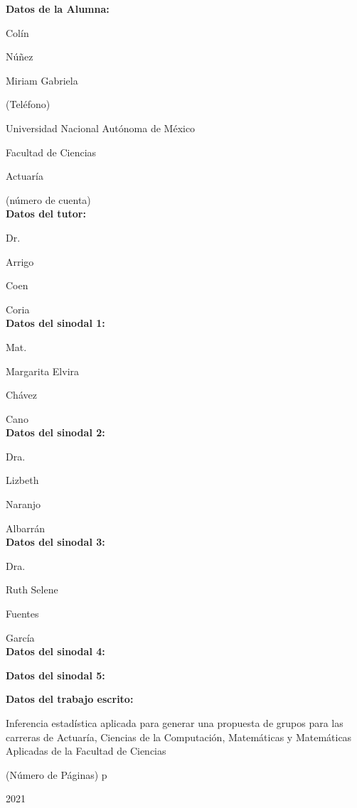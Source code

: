{\setlength{\parskip}{0mm}
\textbf{Datos de la Alumna:}

Colín

Núñez

Miriam Gabriela

(Teléfono)

Universidad Nacional Autónoma de México

Facultad de Ciencias

Actuaría

(número de cuenta)\\


\textbf{Datos del tutor:}

Dr.

Arrigo

Coen

Coria\\


\textbf{Datos del sinodal 1:}

Mat.

Margarita Elvira

Chávez

Cano\\


\textbf{Datos del sinodal 2:}

Dra.

Lizbeth

Naranjo

Albarrán\\


\textbf{Datos del sinodal 3:}

Dra.

Ruth Selene

Fuentes

García\\


\textbf{Datos del sinodal 4:}




\textbf{Datos del sinodal 5:}




\textbf{Datos del trabajo escrito:}

Inferencia estadística aplicada para generar una propuesta de grupos para las carreras de Actuaría, Ciencias de la Computación, Matemáticas y Matemáticas Aplicadas de la Facultad de Ciencias

(Número de Páginas) p

2021
}






